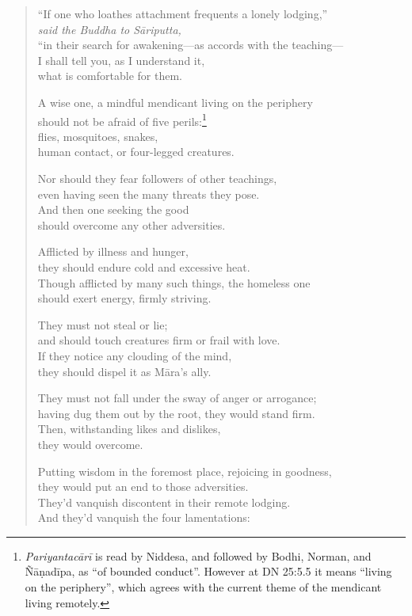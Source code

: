 \documentclass[12pt,openany]{book}%
\newcommand*{\scspeaker}[1]{\hspace{2em}\textit{#1}}
\begin{document}
\begin{verse}
“If one who loathes attachment frequents a lonely lodging,” \\
\scspeaker{said the Buddha to \textsanskrit{Sāriputta}, }\\
“in their search for awakening—as accords with the teaching—\\
I shall tell you, as I understand it, \\
what is comfortable for them. 

A wise one, a mindful mendicant living on the periphery \\
should not be afraid of five perils:\footnote{\textit{\textsanskrit{Pariyantacārī}} is read by Niddesa, and followed by Bodhi, Norman, and \textsanskrit{Ñāṇadīpa}, as “of bounded conduct”. However at DN 25:5.5 it means “living on the periphery”, which agrees with the current theme of the mendicant living remotely. } \\
flies, mosquitoes, snakes, \\
human contact, or four-legged creatures. 

Nor should they fear followers of other teachings, \\
even having seen the many threats they pose. \\
And then one seeking the good \\
should overcome any other adversities. 

Afflicted by illness and hunger, \\
they should endure cold and excessive heat. \\
Though afflicted by many such things, the homeless one \\
should exert energy, firmly striving. 

They must not steal or lie; \\
and should touch creatures firm or frail with love. \\
If they notice any clouding of the mind, \\
they should dispel it as \textsanskrit{Māra}’s ally. 

They must not fall under the sway of anger or arrogance; \\
having dug them out by the root, they would stand firm. \\
Then, withstanding likes and dislikes, \\
they would overcome. 

Putting wisdom in the foremost place, rejoicing in goodness, \\
they would put an end to those adversities. \\
They’d vanquish discontent in their remote lodging. \\
And they’d vanquish the four lamentations: 


\end{verse}
\end{document}

